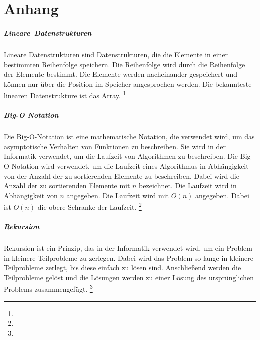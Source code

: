 \documentclass[./entry.tex]{subfiles}
\begin{document}
    \chapter{Anhang}

    \paragraph{Lineare\ Datenstrukturen}
    Lineare Datenstrukturen sind Datenstrukturen, die die Elemente in einer bestimmten Reihenfolge speichern. Die
    Reihenfolge wird durch die Reihenfolge der Elemente bestimmt. Die Elemente werden nacheinander gespeichert und
    können nur über die Position im Speicher angesprochen werden. Die bekannteste linearen Datenstrukture ist
    das Array.
    \footnote{}

    \paragraph{Big-O Notation}
    Die Big-O-Notation ist eine mathematische Notation, die verwendet wird, um das asymptotische Verhalten von
    Funktionen zu beschreiben. Sie wird in der Informatik verwendet, um die Laufzeit von Algorithmen zu beschreiben.
    Die Big-O-Notation wird verwendet, um die Laufzeit eines Algorithmus in Abhängigkeit von der Anzahl der zu
    sortierenden Elemente zu beschreiben. Dabei wird die Anzahl der zu sortierenden Elemente mit $n$ bezeichnet.
    Die Laufzeit wird in Abhängigkeit von $n$ angegeben. Die Laufzeit wird mit $O(n)$ angegeben. Dabei ist $O(n)$
    die obere Schranke der Laufzeit.
    \footnote{}
    
    \paragraph{Rekursion}
    Rekursion ist ein Prinzip, das in der Informatik verwendet wird, um ein Problem in kleinere Teilprobleme zu
    zerlegen. Dabei wird das Problem so lange in kleinere Teilprobleme zerlegt, bis diese einfach zu lösen sind.
    Anschließend werden die Teilprobleme gelöst und die Lösungen werden zu einer Lösung des ursprünglichen Problems
    zusammengefügt.
    \footnote{}
\end{document}
